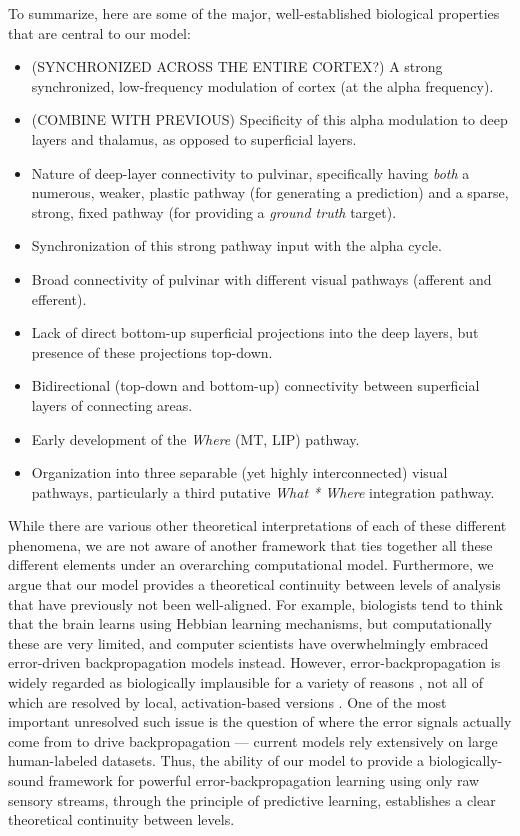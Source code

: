 \documentclass[11pt,twoside]{article}
\newif\myifpdf
\begin{document}
To summarize, here are some of the major, well-established biological properties that are central to our model:
\begin{itemize}
\item (SYNCHRONIZED ACROSS THE ENTIRE CORTEX?) A strong synchronized, low-frequency modulation of cortex (at the alpha frequency).
\item (COMBINE WITH PREVIOUS) Specificity of this alpha modulation to deep layers and thalamus, as opposed to superficial layers.
\item Nature of deep-layer connectivity to pulvinar, specifically having {\em both} a numerous, weaker, plastic pathway (for generating a prediction) and a sparse, strong, fixed pathway (for providing a {\em ground truth} target).
\item Synchronization of this strong pathway input with the alpha cycle.
\item Broad connectivity of pulvinar with different visual pathways (afferent and efferent).
\item Lack of direct bottom-up superficial projections into the deep layers, but presence of these projections top-down.
\item Bidirectional (top-down and bottom-up) connectivity between superficial layers of connecting areas.
\item Early development of the {\em Where} (MT, LIP) pathway.
\item Organization into three separable (yet highly interconnected) visual pathways, particularly a third putative {\em What * Where} integration pathway.
\end{itemize}

While there are various other theoretical interpretations of each of these different phenomena, we are not aware of another framework that ties together all these different elements under an overarching computational model.  Furthermore, we argue that our model provides a theoretical continuity between levels of analysis that have previously not been well-aligned.  For example, biologists tend to think that the brain learns using Hebbian learning mechanisms, but computationally these are very limited, and computer scientists have overwhelmingly embraced error-driven backpropagation models instead.  However, error-backpropagation is widely regarded as biologically implausible for a variety of reasons \cite[e.g.,]{Crick89}, not all of which are resolved by local, activation-based versions \cite{OReilly96,Movellan90,XieSeung03,ScellierBengio17}.  One of the most important unresolved such issue is the question of where the error signals actually come from to drive backpropagation --- current models rely extensively on large human-labeled datasets.  Thus, the ability of our model to provide a biologically-sound framework for powerful error-backpropagation learning using only raw sensory streams, through the principle of predictive learning, establishes a clear theoretical continuity between levels.
\end{document}

